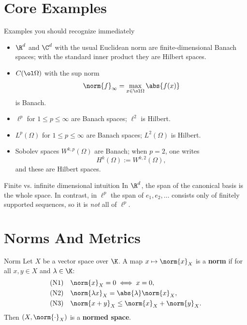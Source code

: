 \documentclass[header={Lecture 1 Exam Study Notes}]{study-note}
\newcommand{\Lp}{L^p}
\begin{document}
\section{Core Examples}

\begin{exbox}{Examples you should recognize immediately}
\begin{itemize}
\item $\R^d$ and $\C^d$ with the usual Euclidean norm are finite-dimensional Banach spaces; with the standard inner product they are Hilbert spaces.
\item $C(\ol\Omega)$ with the sup norm
\[
\norm{f}_{\infty}=\max_{x\in\ol\Omega}\abs{f(x)}
\]
is Banach.
\item $\ell^p$ for $1\le p\le \infty$ are Banach spaces; $\ell^2$ is Hilbert.
\item $\Lp(\Omega)$ for $1\le p\le \infty$ are Banach spaces; $L^2(\Omega)$ is Hilbert.
\item Sobolev spaces $W^{k,p}(\Omega)$ are Banach; when $p=2$, one writes
\[
H^k(\Omega):=W^{k,2}(\Omega),
\]
and these are Hilbert spaces.
\end{itemize}
\end{exbox}

\begin{warningbox}{Finite vs. infinite dimensional intuition}
In $\R^d$, the span of the canonical basis is the whole space. In contrast, in $\ell^p$ the span of $e_1,e_2,\dots$ consists only of finitely supported sequences, so it is \emph{not} all of $\ell^p$.
\end{warningbox}

\section{Norms And Metrics}

\begin{defbox}{Norm}
Let $X$ be a vector space over $\K$. A map $x\mapsto \norm{x}_X$ is a \textbf{norm} if for all $x,y\in X$ and $\lambda\in\K$:
\begin{align*}
\text{(N1)}\quad & \norm{x}_X=0 \iff x=0,
\\
\text{(N2)}\quad & \norm{\lambda x}_X=\abs{\lambda}\norm{x}_X,
\\
\text{(N3)}\quad & \norm{x+y}_X\le \norm{x}_X+\norm{y}_X.
\end{align*}
Then $(X,\norm{\cdot}_X)$ is a \textbf{normed space}.
\end{defbox}
\end{document}
